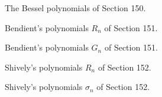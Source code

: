 \begin{problem}\label{problem13chapter14}
The Bessel polynomials of Section 150.
\end{problem}
\begin{solution}

\end{solution}
\begin{problem}\label{problem14chapter14}
Bendient's polynomials $R_n$ of Section 151.
\end{problem}
\begin{solution}

\end{solution}
\begin{problem}\label{problem15chapter14}
Bendient's polynomials $G_n$ of Section 151.
\end{problem}
\begin{solution}

\end{solution}
\begin{problem}\label{problem16chapter14}
Shively's polynomials $R_n$ of Section 152.
\end{problem}
\begin{solution}

\end{solution}
\begin{problem}\label{problem17chapter14}
Shively's polynomials $\sigma_n$ of Section 152.
\end{problem}
\begin{solution}

\end{solution}